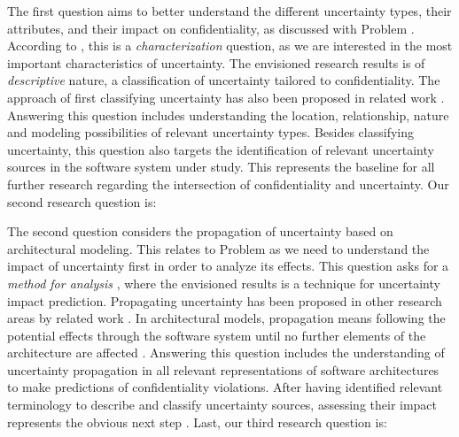\RQone\label{rq:1}

The first question aims to better understand the different uncertainty types, their attributes, and their impact on confidentiality, as discussed with Problem .
According to \textcite{shaw_what_2002}, this is a \emph{characterization} question, as we are interested in the most important characteristics of uncertainty.
The envisioned research results is of \emph{descriptive} nature, a classification of uncertainty tailored to confidentiality. 
The approach of first classifying uncertainty has also been proposed in related work \cite{hezavehi_uncertainty_2021,troya_uncertainty_2021}.
Answering this question includes understanding the location, relationship, nature and modeling possibilities of relevant uncertainty types.
Besides classifying uncertainty, this question also targets the identification of relevant uncertainty sources in the software system under study.
This represents the baseline for all further research regarding the intersection of confidentiality and uncertainty.
Our second research question is:


\RQtwo\label{rq:2}

The second question considers the propagation of uncertainty based on architectural modeling.
This relates to Problem  as we need to understand the impact of uncertainty first in order to analyze its effects.
This question asks for a \emph{method for analysis} \cite{shaw_what_2002}, where the envisioned results is a technique for uncertainty impact prediction.
Propagating uncertainty has been proposed in other research areas by related work \cite{camara_addressing_2022,hezavehi_uncertainty_2021}.
In architectural models, propagation means following the potential effects through the software system until no further elements of the architecture are affected \cite{busch_architecture-based_2020,rostami_architecture-based_2015}.
Answering this question includes the understanding of uncertainty propagation in all relevant representations of software architectures to make predictions of confidentiality violations.
After having identified relevant terminology to describe and classify uncertainty sources, assessing their impact represents the obvious next step \cite{hezavehi_uncertainty_2021}.
Last, our third research question is:


\RQthree\label{rq:3}

